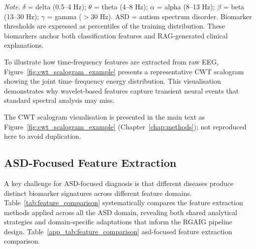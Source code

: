 \vspace{0.5em}\noindent\textit{Note.} $\delta$ = delta (0.5--4 Hz); $\theta$ = theta (4--8 Hz); $\alpha$ = alpha (8--13 Hz); $\beta$ = beta (13--30 Hz); $\gamma$ = gamma ($>$30 Hz).  ASD = autism spectrum disorder. Biomarker thresholds are expressed as percentiles of the training distribution. These biomarkers anchor both classification features and RAG-generated clinical explanations.

\noindent To illustrate how time-frequency features are extracted from raw EEG, Figure~\ref{fig:cwt_scalogram_example} presents a representative CWT scalogram showing the joint time--frequency energy distribution. This visualisation demonstrates why wavelet-based features capture transient neural events that standard spectral analysis may miss.

\noindent The CWT scalogram visualisation is presented in the main text as Figure~\ref{fig:cwt_scalogram_example} (Chapter~\ref{chap:methods}); not reproduced here to avoid duplication.


\subsection{ASD-Focused Feature Extraction}

A key challenge for ASD-focused diagnosis is that different diseases produce distinct biomarker signatures across different feature domains. Table~\ref{tab:feature_comparison} systematically compares the feature extraction methods applied across all the ASD domain, revealing both shared analytical strategies and domain-specific adaptations that inform the RGAIG pipeline design.
\noindent Table~\ref{app_tab:feature_comparison} asd-focused feature extraction comparison.

